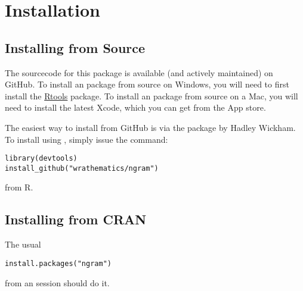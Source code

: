 \section{Installation}
\label{sec:installation}


\subsection{Installing from Source}

The sourcecode for this package is available (and actively maintained) on 
GitHub.  To install an \R package from source on Windows, you will 
need to first install the 
\href{http://cran.r-project.org/bin/windows/Rtools/Rtools216.exe}{Rtools} 
package.  To install an \R package from source on a Mac, you will need to install
the latest Xcode, which you can get from the App store.

The easiest way to install \thispackage from GitHub is via the 
\href{http://cran.r-project.org/web/packages/devtools/index.html}%
{}
package by Hadley Wickham.  To install \thispackage
using , simply issue the command:
\begin{lstlisting}[language=rr]
library(devtools)
install_github("wrathematics/ngram")
\end{lstlisting}
from R. 


\subsection{Installing from CRAN}

The usual
\begin{lstlisting}[language=rr]
install.packages("ngram")
\end{lstlisting}
from an  session should do it.